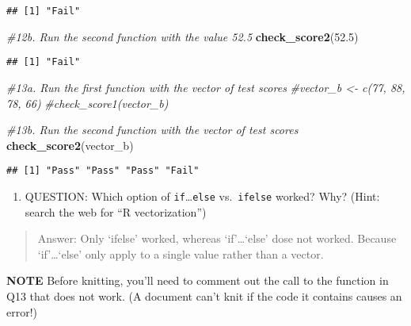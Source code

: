 \documentclass[
]{article}
\newenvironment{Shaded}{\begin{snugshade}}{\end{snugshade}}
\newcommand{\CommentTok}[1]{\textcolor[rgb]{0.56,0.35,0.01}{\textit{#1}}}
\newcommand{\FloatTok}[1]{\textcolor[rgb]{0.00,0.00,0.81}{#1}}
\newcommand{\FunctionTok}[1]{\textcolor[rgb]{0.13,0.29,0.53}{\textbf{#1}}}
\newcommand{\NormalTok}[1]{#1}
\providecommand{\tightlist}{%
  \setlength{\itemsep}{0pt}\setlength{\parskip}{0pt}}
\begin{document}
\begin{verbatim}
## [1] "Fail"
\end{verbatim}

\begin{Shaded}
\begin{Highlighting}[]
\CommentTok{\#12b. Run the second function with the value 52.5}
\FunctionTok{check\_score2}\NormalTok{(}\FloatTok{52.5}\NormalTok{)}
\end{Highlighting}
\end{Shaded}

\begin{verbatim}
## [1] "Fail"
\end{verbatim}

\begin{Shaded}
\begin{Highlighting}[]
\CommentTok{\#13a. Run the first function with the vector of test scores}
\CommentTok{\#vector\_b \textless{}{-} c(77, 88, 78, 66)}
\CommentTok{\#check\_score1(vector\_b)}

\CommentTok{\#13b. Run the second function with the vector of test scores}
\FunctionTok{check\_score2}\NormalTok{(vector\_b)}
\end{Highlighting}
\end{Shaded}

\begin{verbatim}
## [1] "Pass" "Pass" "Pass" "Fail"
\end{verbatim}

\begin{enumerate}
\def\labelenumi{\arabic{enumi}.}
\setcounter{enumi}{13}
\tightlist
\item
  QUESTION: Which option of \texttt{if}\ldots{}\texttt{else}
  vs.~\texttt{ifelse} worked? Why? (Hint: search the web for ``R
  vectorization'')
\end{enumerate}

\begin{quote}
Answer: Only `ifelse' worked, whereas `if'\ldots{}`else' dose not
worked. Because `if'\ldots{}`else' only apply to a single value rather
than a vector.
\end{quote}

\textbf{NOTE} Before knitting, you'll need to comment out the call to
the function in Q13 that does not work. (A document can't knit if the
code it contains causes an error!)
\end{document}
